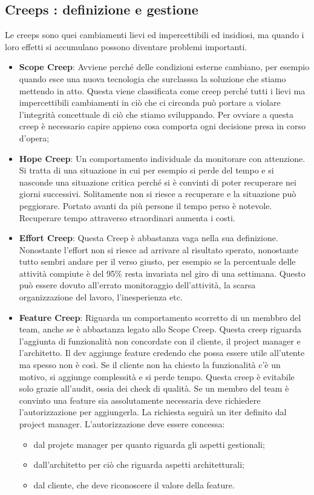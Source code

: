 \subsection{Creeps : definizione e gestione}
Le creeps sono quei cambiamenti lievi ed impercettibili ed insidiosi, ma quando i loro effetti si accumulano possono diventare problemi importanti.
\begin{itemize}
	\item \textbf{Scope Creep}: Avviene perché delle condizioni esterne cambiano, per esempio quando esce una nuova tecnologia che surclasssa la soluzione che stiamo mettendo in atto. Questa viene classificata come creep perché tutti i lievi ma impercettibili cambiamenti in ciò che ci circonda può portare a violare l'integrità concettuale di ciò che stiamo sviluppando. Per ovviare a questa creep è necessario capire appieno cosa comporta ogni decisione presa in corso d'opera;
	\item \textbf{Hope Creep}: Un comportamento individuale da monitorare con attenzione. Si tratta di una situazione in cui per esempio si perde del tempo e si nasconde una situazione critica perché si è convinti di poter recuperare nei giorni successivi. Solitamente non si riesce a recuperare e la situazione può peggiorare. Portato avanti da più persone il tempo perso è notevole. Recuperare tempo attraverso straordinari aumenta i costi.
	\item \textbf{Effort Creep}: Questa Creep è abbastanza vaga nella sua definizione. Nonostante l'effort non si riesce ad arrivare al risultato sperato, nonostante tutto sembri andare per il verso giusto, per esempio se la percentuale delle attività compiute è del 95\% resta invariata nel giro di una settimana. Questo può essere dovuto all'errato monitoraggio dell'attività, la scarsa organizzazione del lavoro, l'inesperienza etc.
	\item \textbf{Feature Creep}: Riguarda un comportamento scorretto di un membbro del team, anche se è abbastanza legato allo Scope Creep. Questa creep riguarda l'aggiunta di funzionalità non concordate con il cliente, il project manager e l'architetto. Il dev aggiunge feature credendo che possa essere utile all'utente ma spesso non è così. Se il cliente non ha chiesto la funzionalità c'è un motivo, si aggiunge complessità e si perde tempo. Questa creep è evitabile solo grazie all'audit, ossia dei check di qualità.\newline
	Se un membro del team è convinto una feature sia assolutamente necessaria deve richiedere l'autorizzazione per aggiungerla. La richiesta seguirà un iter definito dal project manager. L'autorizzazione deve essere concessa:
	\begin{itemize}
		\item dal projetc manager per quanto riguarda gli aspetti gestionali;
		\item dall'architetto per ciò che riguarda aspetti architetturali;
		\item dal cliente, che deve riconoscere il valore della feature.
	\end{itemize}
\end{itemize}
